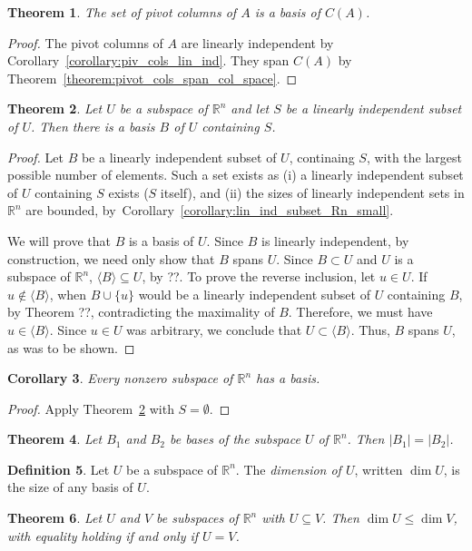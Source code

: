 \documentclass{amsart}
\newcommand{\RR}{\mathbb{R}}
\newtheorem{theorem}{Theorem}[section]
\newtheorem{corollary}[theorem]{Corollary}
\theoremstyle{definition}
\newtheorem{definition}[theorem]{Definition}
\begin{document}
\begin{theorem}
  The set of pivot columns of $A$ is a basis of $C(A)$.
\end{theorem}
\begin{proof}
The pivot columns of $A$ are linearly independent by Corollary~\ref{corollary:piv_cols_lin_ind}. They  span $C(A)$ by Theorem~\ref{theorem:pivot_cols_span_col_space}.
\end{proof}

\begin{theorem}\label{theorem:basis_containing_S}
Let $U$ be a subspace of $\RR^n$ and let $S$ be a linearly independent subset of $U$. Then there is a basis $B$ of $U$ containing $S$.
\end{theorem}

\begin{proof}
Let $B$ be a linearly independent subset of $U$, continaing $S$, with the largest possible number of elements.
Such a set exists as (i) a linearly independent subset of $U$ containing $S$ exists ($S$ itself), and (ii) the sizes of linearly independent sets in $\RR^n$ are bounded, by~Corollary~\ref{corollary:lin_ind_subset_Rn_small}. 

We will prove that $B$ is a basis of $U$.
Since $B$ is linearly independent, by construction, we need only show that $B$ spans $U$.
Since $B\subset U$ and $U$ is a subspace of $\RR^n$, $\langle B\rangle\subseteq U$, by ??.
To prove the reverse inclusion, let $u\in U$. If $u\notin\langle B\rangle$, when $B\cup \{u\}$ would be a linearly independent subset of $U$ containing $B$, by Theorem ??, contradicting the maximality of $B$. Therefore, we must have $u\in \langle B\rangle$. Since $u\in U$ was arbitrary, we conclude that $U\subset \langle B\rangle$. Thus, $B$ spans $U$, as was to be shown.
\end{proof}

\begin{corollary}
Every nonzero subspace of $\RR^n$ has a basis.
\end{corollary}
\begin{proof}
Apply Theorem~\ref{theorem:basis_containing_S} with $S=\emptyset$.
\end{proof}

\begin{theorem}
Let $B_1$ and $B_2$ be bases of the subspace $U$ of $\RR^n$. Then $|B_1|=|B_2|$.
\end{theorem}

\begin{definition}
Let $U$ be a subspace of $\RR^n$. The \emph{dimension of $U$}, written $\dim U$, is the size of any basis of $U$.
\end{definition}

\begin{theorem}
Let $U$ and $V$ be subspaces of $\RR^n$ with $U\subseteq V$. Then $\dim U\leq \dim V$, with equality holding if and only if $U=V$.
\end{theorem}
\end{document}

